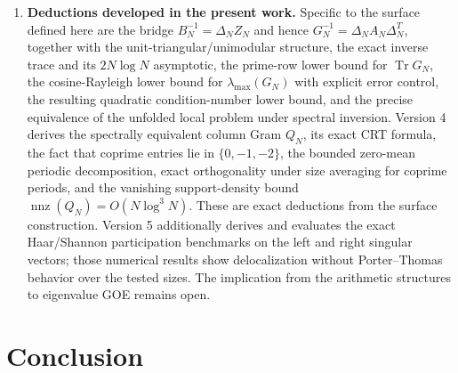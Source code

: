 \documentclass[11pt]{amsart}
\numberwithin{equation}{section}
\theoremstyle{plain}
\theoremstyle{definition}
\theoremstyle{remark}
\newcommand{\Tr}{\operatorname{Tr}}
\begin{document}
\begin{enumerate}[label=(\roman*)]
\item \textbf{Deductions developed in the present work.}
Specific to the surface defined here are the bridge $B_N^{-1}=\Delta_NZ_N$ and hence $G_N^{-1}=\Delta_NA_N\Delta_N^T$, together with the unit-triangular/unimodular structure, the exact inverse trace and its $2N\log N$ asymptotic, the prime-row lower bound for $\Tr G_N$, the cosine-Rayleigh lower bound for $\lambda_{\max}(G_N)$ with explicit error control, the resulting quadratic condition-number lower bound, and the precise equivalence of the unfolded local problem under spectral inversion.  Version 4 derives the spectrally equivalent column Gram $Q_N$, its exact CRT formula, the fact that coprime entries lie in $\{0,-1,-2\}$, the bounded zero-mean periodic decomposition, exact orthogonality under size averaging for coprime periods, and the vanishing support-density bound $\operatorname{nnz}(Q_N)=O(N\log^3N)$.  These are exact deductions from the surface construction.  Version 5 additionally derives and evaluates the exact Haar/Shannon participation benchmarks on the left and right singular vectors; those numerical results show delocalization without Porter--Thomas behavior over the tested sizes.  The implication from the arithmetic structures to eigenvalue GOE remains open.
\end{enumerate}

\section{Conclusion}
\label{sec:conclusion}
\end{document}
